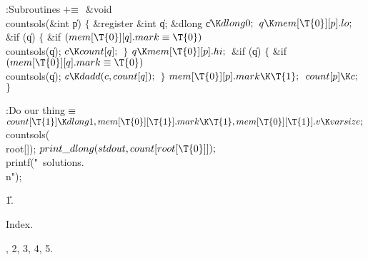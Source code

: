 \Y\B\4\*:Subroutines\X${}\mathrel+\equiv{}$\6
\1\1\&{void} \\{countsols}(\&{int} \|p)\2\2\6
${}\{{}$\1\6
\&{register} \&{int} \|q;\6
\&{dlong} \|c${}\K\\{dlong0};{}$\7
${}\|q\K\\{mem}[\T{0}][\|p].\\{lo};{}$\6
\&{if} (\|q)\5
${}\{{}$\1\6
\&{if} ${}(\\{mem}[\T{0}][\|q].\\{mark}\E\T{0}){}$\1\5
\\{countsols}(\|q);\2\6
${}\|c\K\\{count}[\|q];{}$\6
\4${}\}{}$\2\6
${}\|q\K\\{mem}[\T{0}][\|p].\\{hi};{}$\6
\&{if} (\|q)\5
${}\{{}$\1\6
\&{if} ${}(\\{mem}[\T{0}][\|q].\\{mark}\E\T{0}){}$\1\5
\\{countsols}(\|q);\2\6
${}\|c\K\\{dadd}(\|c,\39\\{count}[\|q]);{}$\6
\4${}\}{}$\2\6
${}\\{mem}[\T{0}][\|p].\\{mark}\K\T{1};{}$\6
${}\\{count}[\|p]\K\|c;{}$\6
\4${}\}{}$\2\par
\fi

\B{}\*:Do our thing\X${}\equiv{}$\6
$\\{count}[\T{1}]\K\\{dlong1},\39\\{mem}[\T{0}][\T{1}].\\{mark}\K\T{1},\39%
\\{mem}[\T{0}][\T{1}].\|v\K\\{varsize};{}$\6
\\{countsols}(\\{root}[]);\6
${}\\{print\_dlong}(\\{stdout},\39\\{count}[\\{root}[\T{0}]]);{}$\6
\\{printf}(\.{"\ solutions.\\n"});\par
\U1\*.\fi

Index.

\fi


\*, 2\*, 3\*, 4\*, 5\*.

\inx
\fin
\con
